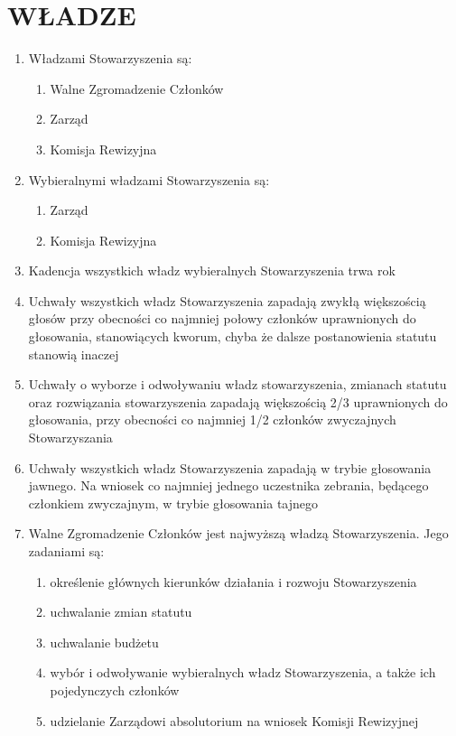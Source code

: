 \documentclass{article}
\begin{document}
\section{WŁADZE}
  \begin{enumerate}
    \item Władzami Stowarzyszenia są:
      \begin{enumerate}
        \item Walne Zgromadzenie Członków
        \item Zarząd
        \item Komisja Rewizyjna
      \end{enumerate}
    \item Wybieralnymi władzami Stowarzyszenia są:
      \begin{enumerate}
        \item Zarząd
        \item Komisja Rewizyjna
      \end{enumerate}
    \item Kadencja wszystkich władz wybieralnych Stowarzyszenia trwa rok
    \item Uchwały wszystkich władz Stowarzyszenia zapadają zwykłą większością głosów przy obecności co najmniej połowy członków uprawnionych do głosowania, stanowiących kworum, chyba że dalsze postanowienia statutu stanowią inaczej
    \item Uchwały o wyborze i odwoływaniu władz stowarzyszenia, zmianach statutu oraz rozwiązania stowarzyszenia zapadają większością 2/3 uprawnionych do głosowania, przy obecności co najmniej 1/2 członków zwyczajnych Stowarzyszania
    \item Uchwały wszystkich władz Stowarzyszenia zapadają w trybie głosowania jawnego. Na wniosek co najmniej jednego uczestnika zebrania, będącego członkiem zwyczajnym, w trybie głosowania tajnego
    \item Walne Zgromadzenie Członków jest najwyższą władzą Stowarzyszenia. Jego zadaniami są:
      \begin{enumerate}
        \item określenie głównych kierunków działania i rozwoju Stowarzyszenia
        \item uchwalanie zmian statutu
        \item uchwalanie budżetu
        \item wybór i odwoływanie wybieralnych władz Stowarzyszenia, a także ich pojedynczych członków
        \item udzielanie Zarządowi absolutorium na wniosek Komisji Rewizyjnej

\end{enumerate}
\end{enumerate}
\end{document}
